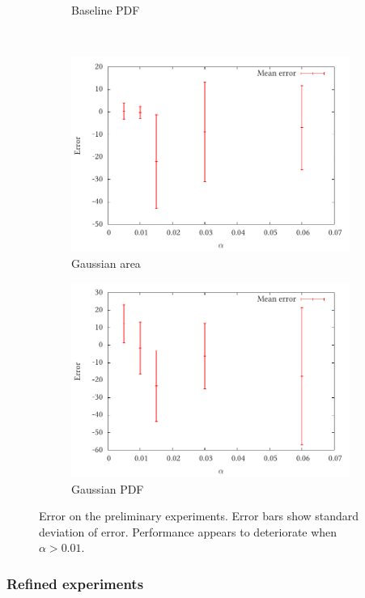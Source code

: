 \documentclass[a4paper,11pt]{article}
\begin{document}
\begin{center}
\begin{figure}
\begin{subfigure}{0.5\textwidth}
\caption{Baseline PDF}
\end{subfigure}\\
\begin{subfigure}{0.5\textwidth}
\includegraphics[width=\textwidth]{gauss_area_prelim}
\caption{Gaussian area}
\end{subfigure}
\begin{subfigure}{0.5\textwidth}
\includegraphics[width=\textwidth]{gauss_pmf_prelim}
\caption{Gaussian PDF}
\end{subfigure}
\caption{Error on the preliminary experiments. Error bars show standard
deviation of error. Performance appears to deteriorate when $\alpha>0.01$.}
\label{fig:prelimerror}
\end{figure}
\end{center}
\subsubsection{Refined experiments}
\label{sec-7-1-2}
\end{document}
